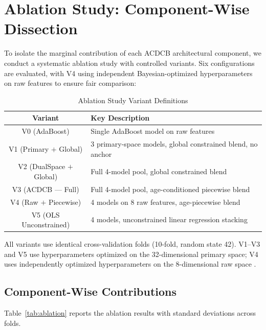 \documentclass[journal]{IEEEtran}
\begin{document}
\section{Ablation Study: Component-Wise Dissection}

To isolate the marginal contribution of each ACDCB architectural component, we conduct a systematic ablation study with controlled variants. Six configurations are evaluated, with V4 using independent Bayesian-optimized hyperparameters on raw features to ensure fair comparison:

\begin{table}[!t]
\renewcommand{\arraystretch}{1.2}
\caption{Ablation Study Variant Definitions}
\label{tab:ablation_def}
\centering
\begin{tabular}{cp{5.8cm}}
\toprule
\textbf{Variant} & \textbf{Key Description} \\
\midrule
V0 (AdaBoost)    & Single AdaBoost model on raw features \\
V1 (Primary $+$ Global)  & 3 primary-space models, global constrained blend, no anchor \\
V2 (DualSpace $+$ Global) & Full 4-model pool, global constrained blend \\
V3 (ACDCB --- Full)     & Full 4-model pool, age-conditioned piecewise blend \\
V4 (Raw $+$ Piecewise)   & 4 models on 8 raw features, age-piecewise blend \\
V5 (OLS Unconstrained)   & 4 models, unconstrained linear regression stacking \\
\bottomrule
\end{tabular}
\end{table}

All variants use identical cross-validation folds (10-fold, random state 42). V1--V3 and V5 use hyperparameters optimized on the 32-dimensional primary space; V4 uses independently optimized hyperparameters on the 8-dimensional raw space \cite{chen2016xgboost,ke2017lightgbm}.

\subsection{Component-Wise Contributions}

Table~\ref{tab:ablation} reports the ablation results with standard deviations across folds.
\end{document}
